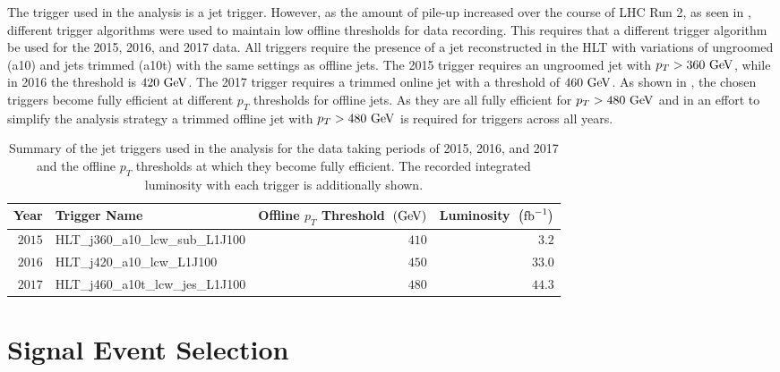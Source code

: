 The trigger used in the analysis is a \largeR{} jet trigger.
However, as the amount of pile-up increased over the course of LHC Run 2, as seen in , different \largeR{} trigger algorithms were used to maintain low offline thresholds for data recording.
This requires that a different trigger algorithm be used for the 2015, 2016, and 2017 data.
All triggers require the presence of a \largeR{} jet reconstructed in the \gls{HLT} with variations of ungroomed (a10) and \largeR{} jets trimmed (a10t) with the same settings as offline \largeR{} jets.
The 2015 trigger requires an ungroomed \largeR{} jet with $p_{T} > 360~\mathrm{GeV}$, while in 2016 the threshold is $420~\mathrm{GeV}$.
The 2017 trigger requires a trimmed online jet with a threshold of $460~\mathrm{GeV}$.
As shown in , the chosen triggers become fully efficient at different $p_{T}$ thresholds for offline \largeR{} jets.
As they are all fully efficient for $p_{T} > 480~\mathrm{GeV}$ and in an effort to simplify the analysis strategy a trimmed offline jet with $p_{T} > 480~\mathrm{GeV}$ is required for triggers across all years.

\begin{table}[htpb]
 \centering
 \caption[Summary of the triggers used in the analysis.]{%
  Summary of the \largeR{} jet triggers used in the analysis for the data taking periods of 2015, 2016, and 2017 and the offline $p_{T}$ thresholds at which they become fully efficient.
  The recorded integrated luminosity with each trigger is additionally shown.}
 \begin{tabular}{@{}rlrr@{}}
  \toprule
  Year   & Trigger Name                 & Offline $p_{T}$ Threshold~$(\mathrm{GeV})$ & Luminosity~$\left(\mathrm{fb}^{-1}\right)$ \\ \midrule
  $2015$ & HLT_j360_a10_lcw_sub_L1J100  & $410$                              & $3.2$                          \\
  $2016$ & HLT_j420_a10_lcw_L1J100      & $450$                              & $33.0$                         \\
  $2017$ & HLT_j460_a10t_lcw_jes_L1J100 & $480$                              & $44.3$                         \\
  \bottomrule
 \end{tabular}
 \label{table:annual_triggers}
\end{table}

\section{Signal Event Selection}\label{sec:event_selection}

